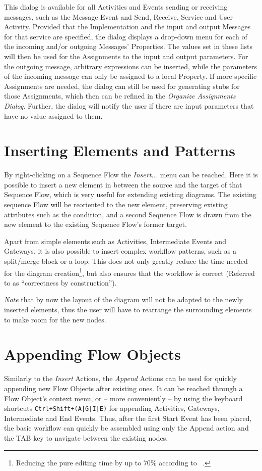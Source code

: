 This dialog is available for all Activities and Events sending or receiving
messages, such as the Message Event and Send, Receive, Service and User Activity.
Provided that the Implementation and the input and output Messages for that
service are specified, the dialog displays a drop-down menu for each of the
incoming and/or outgoing Messages' Properties.  The values set in these lists
will then be used for the Assignments to the input and output parameters.  For
the outgoing message, arbitrary expressions can be inserted, while the parameters
of the incoming message can only be assigned to a local Property.  If more specific
Assignments are needed, the dialog can still be used for generating stubs for
those Assignments, which then can be refined in the \emph{Organize Assignments
Dialog}.  Further, the dialog will notify the user if there are input parameters
that have no value assigned to them.



\section{Inserting Elements and Patterns}
\label{sec:user_features_patterns}

By right-clicking on a Sequence Flow the \emph{Insert...} menu can be reached.
Here it is possible to insert a new element in between the source and the target
of that Sequence Flow, which is very useful for extending existing diagrams.  The
existing sequence Flow will be reoriented to the new element, preserving existing
attributes such as the condition, and a second Sequence Flow is drawn from the
new element to the existing Sequence Flow's former target.

Apart from simple elements such as Activities, Intermediate Events and Gateways,
it is also possible to insert complex workflow patterns, such as a split/merge
block or a loop.  This does not only greatly reduce the time needed for the
diagram creation\footnote{Reducing the pure editing time by up to 70\% according
to ~\cite{gschwind2008applying}.}, but also ensures that the workflow is correct
(Referred to as ``correctness by construction'').

\emph{Note} that by now the layout of the diagram will not be adapted to the newly
inserted elements, thus the user will have to rearrange the surrounding elements
to make room for the new nodes.

\section{Appending Flow Objects}
Similarly to the \emph{Insert} Actions, the \emph{Append} Actions can be used for
quickly appending new Flow Objects after existing ones.  It can be reached through
a Flow Object's context menu, or -- more conveniently -- by using the keyboard
shortcuts \texttt{Ctrl+Shift+(A|G|I|E)} for appending Activities, Gateways,
Intermediate and End Events.  Thus, after the first Start Event has been placed,
the basic workflow can quickly be assembled using only the Append action and the
TAB key to navigate between the existing nodes.

